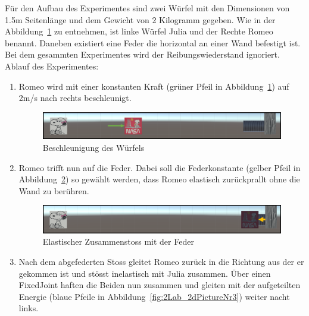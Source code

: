 \documentclass[../main.tex]{subfiles}
\begin{document}
    Für den Aufbau des Experimentes sind zwei Würfel mit den Dimensionen von 1.5m Seitenlänge und dem Gewicht von 2
    Kilogramm gegeben.
    Wie in der Abbildung~\ref{fig:2Lab_2dPictureNr1} zu entnehmen, ist linke Würfel Julia und der Rechte Romeo benannt.
    Daneben existiert eine Feder die horizontal an einer Wand befestigt ist.
    Bei dem gesammten Experimentes wird der Reibungswiederstand ignoriert.
    Ablauf des Experimentes:
 \begin{enumerate}
     \item Romeo wird mit einer konstanten Kraft (grüner Pfeil in Abbildung~\ref{fig:2Lab_2dPictureNr1}) auf
     2m/s nach rechts beschleunigt.
     \begin{figure}[H]
                 \begin{center}
                     \centerline{\includegraphics[width=155mm]{./images/2Lab_2dPictureNr1.png}}
                     \caption{Beschleunigung des Würfels}
                     \label{fig:2Lab_2dPictureNr1}
                 \end{center}
     \end{figure}
     \item Romeo trifft nun auf die Feder. Dabei soll die Federkonstante (gelber Pfeil in Abbildung~\ref{fig:2Lab_2dPictureNr2})
     so gewählt werden, dass Romeo elastisch zurückprallt ohne die Wand zu berühren.
     \begin{figure}[H]
               \begin{center}
                   \centerline{\includegraphics[width=155mm]{./images/2Lab_2dPictureNr2.png}}
                   \caption{Elastischer Zusammenstoss mit der Feder}
                   \label{fig:2Lab_2dPictureNr2}
               \end{center}
     \end{figure}
     \item Nach dem abgefederten Stoss gleitet Romeo zurück in die Richtung aus der er gekommen ist und stösst inelastisch mit Julia zusammen.
     Über einen FixedJoint haften die Beiden nun zusammen und gleiten mit der aufgeteilten Energie
     (blaue Pfeile in Abbildung~\ref{fig:2Lab_2dPictureNr3}) weiter nacht links.

\end{enumerate}
\end{document}
